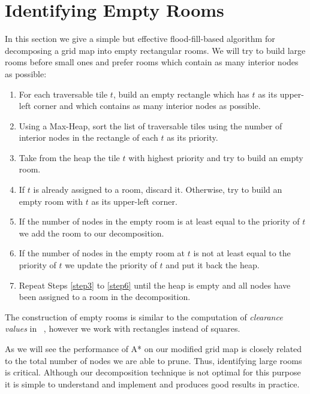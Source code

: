 \section{Identifying Empty Rooms}
\label{empty rooms}
In this section we give a simple but effective flood-fill-based algorithm for decomposing a 
grid map into empty rectangular rooms.
We will try to build large rooms before small ones and prefer rooms which
contain as many interior nodes as possible:

\begin{enumerate}
\item{For each traversable tile $t$, build an empty rectangle which has $t$ as its upper-left corner and which
contains as many interior nodes as possible.}
\item{\label{step2} Using a Max-Heap, sort the list of traversable tiles using the number of
interior nodes in the rectangle of each $t$ as its priority.}
\item{\label{step3} Take from the heap the tile $t$ with highest priority and try to build an empty
room. }
\item{\label{step4} If $t$ is already assigned to a room, discard it. 
Otherwise, try to build an empty room with $t$ as its upper-left corner.}
\item{\label{step5} If the number of nodes in the empty room is at least equal to the priority 
of $t$ we add the room to our decomposition. }
\item{\label{step6} If the number of nodes in the empty room at $t$ is not at least equal to
the priority of $t$ we update the priority of $t$ and put it back the heap.}
\item{\label{step7} Repeat Steps \ref{step3} to \ref{step6} until the heap is
empty and all nodes have been assigned to a room in the decomposition.}
\end{enumerate}

The construction of empty rooms is similar to the computation of \emph{clearance
values} in \citeauthor{harabor08}~, however we work with rectangles
instead of squares. 
\par
As we will see the performance of A* on our modified grid map is closely related to the total 
number of nodes we are able to prune.
Thus, identifying large rooms is critical.
Although our decomposition technique is not optimal for this purpose it is simple
to understand and implement and produces good results in practice.
